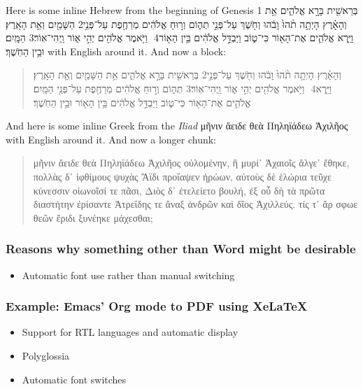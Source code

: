 \documentclass[11pt]{article}
\begin{document}
Here is some inline Hebrew from the beginning of Genesis 1 \texthebrew{‏בְּרֵאשִׁ֖ית בָּרָ֣א אֱלֹהִ֑ים אֵ֥ת הַשָּׁמַ֖יִם וְאֵ֥ת הָאָֽרֶץ׃ ‎2‏ וְהָאָ֗רֶץ הָיְתָ֥ה תֹ֨הוּ֙ וָבֹ֔הוּ וְחֹ֖שֶׁךְ עַל־פְּנֵ֣י תְה֑וֹם וְר֣וּחַ אֱלֹהִ֔ים מְרַחֶ֖פֶת עַל־פְּנֵ֥י הַמָּֽיִם׃ ‎3‏ וַיֹּ֥אמֶר אֱלֹהִ֖ים יְהִ֣י א֑וֹר וַֽיְהִי־אֽוֹר׃ ‎4‏ וַיַּ֧רְא אֱלֹהִ֛ים אֶת־הָא֖וֹר כִּי־ט֑וֹב וַיַּבְדֵּ֣ל אֱלֹהִ֔ים בֵּ֥ין הָא֖וֹר וּבֵ֥ין הַחֹֽשֶׁךְ׃} with English around it. And now a block:

\begin{quote}
\begin{hebrew}
‏‏בְּרֵאשִׁ֖ית בָּרָ֣א אֱלֹהִ֑ים אֵ֥ת הַשָּׁמַ֖יִם וְאֵ֥ת הָאָֽרֶץ׃ ‎2‏ וְהָאָ֗רֶץ הָיְתָ֥ה תֹ֨הוּ֙ וָבֹ֔הוּ וְחֹ֖שֶׁךְ עַל־פְּנֵ֣י תְה֑וֹם וְר֣וּחַ אֱלֹהִ֔ים מְרַחֶ֖פֶת עַל־פְּנֵ֥י הַמָּֽיִם׃ ‎3‏ וַיֹּ֥אמֶר אֱלֹהִ֖ים יְהִ֣י א֑וֹר וַֽיְהִי־אֽוֹר׃ ‎4‏ וַיַּ֧רְא אֱלֹהִ֛ים אֶת־הָא֖וֹר כִּי־ט֑וֹב וַיַּבְדֵּ֣ל אֱלֹהִ֔ים בֵּ֥ין הָא֖וֹר וּבֵ֥ין הַחֹֽשֶׁךְ׃
\end{hebrew}
\end{quote}

And here is some inline Greek from the \emph{Iliad} μῆνιν ἄειδε θεὰ Πηληϊάδεω Ἀχιλῆος with English around it. And now a longer chunk:

\begin{quote}
μῆνιν ἄειδε θεὰ Πηληϊάδεω Ἀχιλῆος οὐλομένην, ἣ μυρί᾽ Ἀχαιοῖς ἄλγε᾽ ἔθηκε, πολλὰς δ᾽ ἰφθίμους ψυχὰς Ἄϊδι προΐαψεν ἡρώων, αὐτοὺς δὲ ἑλώρια τεῦχε κύνεσσιν οἰωνοῖσί τε πᾶσι, Διὸς δ᾽ ἐτελείετο βουλή, ἐξ οὗ δὴ τὰ πρῶτα διαστήτην ἐρίσαντε Ἀτρεΐδης τε ἄναξ ἀνδρῶν καὶ δῖος Ἀχιλλεύς. τίς τ᾽ ἄρ σφωε θεῶν ἔριδι ξυνέηκε μάχεσθαι;
\end{quote}



\subsubsection{Reasons why something other than Word might be desirable}
\label{sec:org110d43e}

\begin{itemize}
\item Automatic font use rather than manual switching
\end{itemize}

\subsubsection{Example: Emacs' Org mode to PDF using XeLaTeX}
\label{sec:orgcf8cd8f}

\begin{itemize}
\item Support for RTL languages and automatic display
\item Polyglossia
\item Automatic font switches
\end{itemize}
\end{document}
